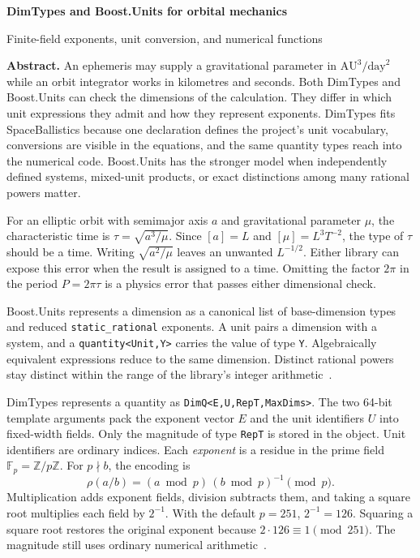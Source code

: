 \documentclass[11pt,a4paper]{article}
\newcommand{\code}[1]{\texttt{#1}}
\newcommand{\Fp}{\mathbb{F}_p}
\newcommand{\heading}[1]{\par\medskip{\large\bfseries #1}\par\nobreak}
\begin{document}
{\LARGE\bfseries DimTypes and Boost.Units for orbital mechanics\par}
\smallskip
{\large Finite-field exponents, unit conversion, and numerical functions\par}
\medskip

\textbf{Abstract.}
An ephemeris may supply a gravitational parameter in
$\mathrm{AU}^3/\mathrm{day}^2$ while an orbit integrator works in kilometres
and seconds. Both DimTypes and Boost.Units can check the dimensions of the
calculation. They differ in which unit expressions they admit and how they
represent exponents. DimTypes fits SpaceBallistics because one declaration
defines the project's unit vocabulary, conversions are visible in the
equations, and the same quantity types reach into the numerical code.
Boost.Units has the stronger model when independently defined systems,
mixed-unit products, or exact distinctions among many rational powers matter.

\heading{1\quad Two algebras for the same physical equation}
For an elliptic orbit with semimajor axis $a$ and gravitational parameter
$\mu$, the characteristic time is $\tau=\sqrt{a^3/\mu}$. Since
$[a]=L$ and $[\mu]=L^3T^{-2}$, the type of $\tau$ should be a time.
Writing $\sqrt{a^2/\mu}$ leaves an unwanted $L^{-1/2}$.
Either library can expose this error when the result is assigned to a time.
Omitting the factor $2\pi$ in the period $P=2\pi\tau$ is a physics error
that passes either dimensional check.

Boost.Units represents a dimension as a canonical list of base-dimension
types and reduced \code{static\_rational} exponents. A unit pairs a dimension
with a system, and a \code{quantity<Unit,Y>} carries the value of type
\code{Y}. Algebraically equivalent expressions reduce to the same dimension.
Distinct rational powers stay distinct within the range of the library's
integer arithmetic~\cite{boostdim,boostunits}.

DimTypes represents a quantity as \code{DimQ<E,U,RepT,MaxDims>}. The two
64-bit template arguments pack the exponent vector $E$ and the unit identifiers
$U$ into fixed-width fields. Only the magnitude of type \code{RepT} is stored
in the object. Unit identifiers are ordinary indices. Each \emph{exponent} is
a residue in the prime field $\Fp=\mathbb{Z}/p\mathbb{Z}$. For $p\nmid b$,
the encoding is
\[
  \rho(a/b)=(a\bmod p)\,(b\bmod p)^{-1}\pmod p .
\]
Multiplication adds exponent fields, division subtracts them, and taking a
square root multiplies each field by $2^{-1}$. With the default $p=251$,
$2^{-1}=126$. Squaring a square root restores the original exponent because
$2\cdot126\equiv1\pmod{251}$. The magnitude still uses ordinary numerical
arithmetic~\cite{dimtypes}.
\end{document}
